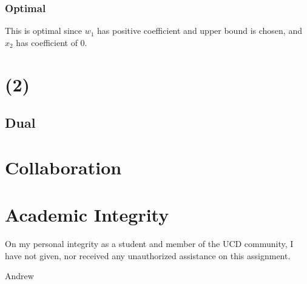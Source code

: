 \documentclass[14pt]{extarticle}
\begin{document}
\subsubsection*{Optimal}
This is optimal since $w_1$ has positive coefficient and upper bound is chosen, and $x_2$ has coefficient of 0.

\section*{(2)}
\subsection*{Dual}

\section*{Collaboration}

\section*{Academic Integrity}
On my personal integrity as a student and member of the UCD community, I have not given, nor received any unauthorized assistance on this assignment.

\bigskip Andrew
\end{document}
